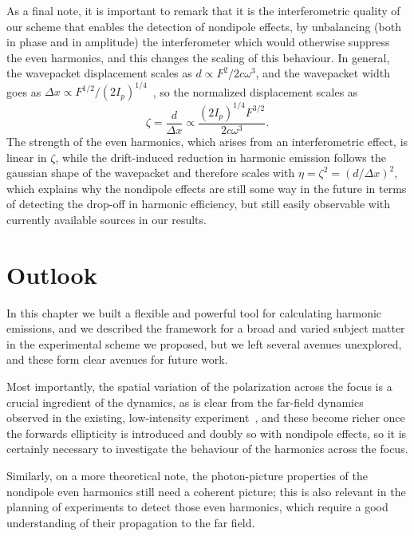 As a final note, it is important to remark that it is the interferometric quality of our scheme that enables the detection of nondipole effects, by unbalancing (both in phase and in amplitude) the interferometer which would otherwise suppress the even harmonics, and this changes the scaling of this behaviour. In general, the wavepacket displacement scales as
$d \propto {F^2}/{2c\omega^3}$,
and the wavepacket width goes as 
$\Delta x \propto {F^{1/2}}/{(2I_p)^{1/4}}$~\cite{hatsagortsyan_laser_driven_2008},
so the normalized displacement scales as 
\begin{equation}
\zeta=\frac{d}{\Delta x}\propto \frac{(2I_p)^{1/4}F^{3/2}}{2c\omega^3}.
\end{equation}
The strength of the even harmonics, which arises from an interferometric effect, is linear in $\zeta$, while the drift-induced reduction in harmonic emission follows the gaussian shape of the wavepacket and therefore scales with $\eta=\zeta^2=(d/\Delta x)^2$, which explains why the nondipole effects are still some way in the future in terms of detecting the drop-off in harmonic efficiency, but still easily observable with currently available sources in our results.









\section{Outlook}
In this chapter we built a flexible and powerful tool for calculating harmonic emissions, and we described the framework for a broad and varied subject matter in the experimental scheme we proposed, but we left several avenues unexplored, and these form clear avenues for future work.

Most importantly, the spatial variation of the polarization across the focus is a crucial ingredient of the dynamics, as is clear from the far-field dynamics observed in the existing, low-intensity experiment~\cite{hickstein_non-collinear_2015}, and these become richer once the forwards ellipticity is introduced and doubly so with nondipole effects, so it is certainly necessary to investigate the behaviour of the harmonics across the focus.

Similarly, on a more theoretical note, the photon-picture properties of the nondipole even harmonics still need a coherent picture; this is also relevant in the planning of experiments to detect those even harmonics, which require a good understanding of their propagation to the far field.

